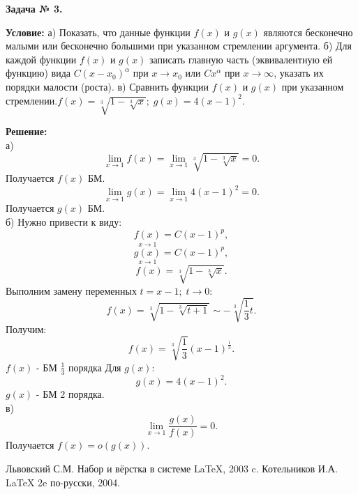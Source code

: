 \documentclass[12pt]{article}
\begin{document}
\newpage
\begin{center}
\textbf{Задача № 3.}   
\end{center}
\textbf{Условие:}
а) Показать, что данные функции $f(x)$ и $g(x)$ являются бесконечно малыми или бесконечно большими
при указанном стремлении аргумента. б) Для каждой функции $f(x)$ и $g(x)$ записать главную часть
(эквивалентную ей функцию)  вида $C(x-x_0)^{\alpha}$ при $x\rightarrow x_0$ или $Cx^{\alpha}$
при $x\rightarrow\infty$, указать их порядки малости (роста). в) Сравнить функции $f(x)$ и $g(x)$ при указанном стремлении.$f(x) = \sqrt[3]{1-{\sqrt[3]{x}}};\; g(x) = 4(x-1)^{2}$.

\textbf{Решение:}\\
а)
$$\lim\limits_{x\rightarrow 1} f(x) = \lim\limits_{x\rightarrow 1}\sqrt[3]{1-{\sqrt[3]{x}}}=0 .$$ 
Получается $f(x)$ БМ.
$$\lim\limits_{x\rightarrow 1} g(x) = \lim\limits_{x\rightarrow 1} 4(x-1)^{2} = 0 .$$
Получается $g(x)$ БМ.\\
б)
Нужно привести к виду:
$$\underset{x \rightarrow 1}{f(x)} = C(x-1)^{p},$$
$$\underset{x \rightarrow 1}{g(x)} = C(x-1)^{p},$$
$$f(x) = \sqrt[3]{1-{\sqrt[3]{x}}}.$$
Выполним замену переменных $t = x-1; \; t \rightarrow 0:$
$$f(x)=\sqrt[3]{1-{\sqrt[3]{t+1}}} \sim -\sqrt[3]{\frac{1}{3} t}.$$
Получим:
$$f(x)= \sqrt[3]{\frac{1}{3}} (x-1)^{\frac{1}{3}}.$$
$f(x)$ - БМ $\frac{1}{3}$ порядка
Для $g(x)$:
$$g(x) = 4(x-1)^{2}.$$
$g(x)$ - БМ $2$ порядка.\\
в)
$$\lim\limits_{x\rightarrow 1} \frac{g(x)}{f(x)} = 0.$$ 
Получается $f(x) = o(g(x))$.

\newpage
{}
\begin{thebibliography}{99}
 Львовский С.М. Набор и вёрстка в системе \LaTeX, 2003 c.
 Котельников И.А. \LaTeX \; 2e по-русски, 2004.
\end{thebibliography}
\end{document}

